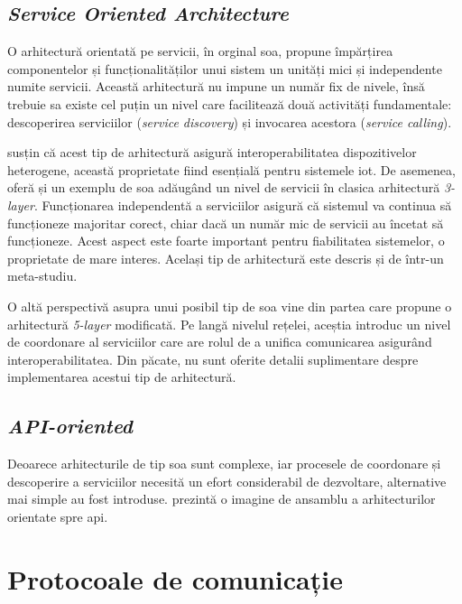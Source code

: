 \subsection{\textit{Service Oriented Architecture}}

O arhitectură orientată pe servicii, în orginal \acrfull{soa}, propune împărțirea componentelor și funcționalităților unui sistem un unități mici și independente numite servicii. Această arhitectură nu impune un număr fix de nivele, însă trebuie sa existe cel puțin un nivel care facilitează două activități fundamentale: descoperirea serviciilor (\textit{service discovery}) și invocarea acestora (\textit{service calling}). 

\cite{Khodadadi2016} susțin că acest tip de arhitectură asigură interoperabilitatea dispozitivelor heterogene, această proprietate fiind esențială pentru sistemele \acrshort{iot}. De asemenea, oferă și un exemplu de \acrshort{soa} adăugând un nivel de servicii în clasica arhitectură \textit{3-layer}. Funcționarea independentă a serviciilor asigură că sistemul va continua să funcționeze majoritar corect, chiar dacă un număr mic de servicii au încetat să funcționeze. Acest aspect este foarte important pentru fiabilitatea sistemelor, o proprietate de mare interes. Același tip de arhitectură este descris și de \cite{Lin2017} într-un meta-studiu.

O altă perspectivă asupra unui posibil tip de \acrshort{soa} vine din partea \cite{LuTan2010} care propune o arhitectură \textit{5-layer} modificată. Pe langă nivelul rețelei, aceștia introduc un nivel de coordonare al serviciilor care are rolul de a unifica comunicarea asigurând interoperabilitatea. Din păcate, nu sunt oferite detalii suplimentare despre implementarea acestui tip de arhitectură.

\subsection{\textit{API-oriented}}

Deoarece arhitecturile de tip \acrshort{soa} sunt complexe, iar procesele de coordonare și descoperire a serviciilor necesită un efort considerabil de dezvoltare, alternative mai simple au fost introduse. \cite{Khodadadi2016} prezintă o imagine de ansamblu a arhitecturilor orientate spre \acrfull{api}. %

\section{Protocoale de comunicație}


